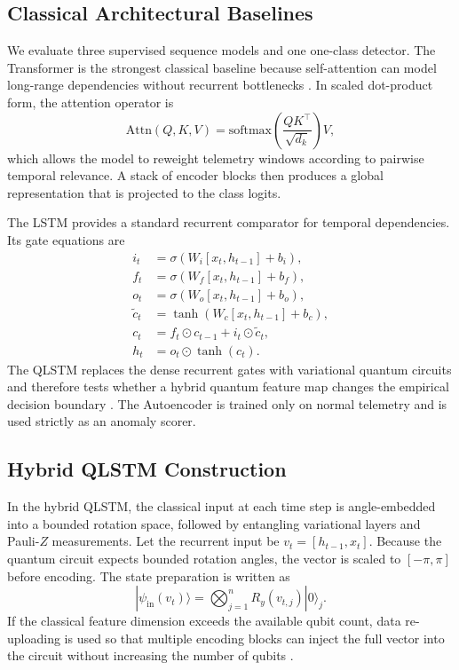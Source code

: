 \subsection{Classical Architectural Baselines}
We evaluate three supervised sequence models and one one-class detector. The Transformer is the strongest classical baseline because self-attention can model long-range dependencies without recurrent bottlenecks \cite{vaswani2017attention}. In scaled dot-product form, the attention operator is
\begin{equation}
\mathrm{Attn}(Q,K,V)=\mathrm{softmax}\!\left(\frac{QK^{\top}}{\sqrt{d_k}}\right)V,
\end{equation}
which allows the model to reweight telemetry windows according to pairwise temporal relevance. A stack of encoder blocks then produces a global representation that is projected to the class logits.

The LSTM provides a standard recurrent comparator for temporal dependencies. Its gate equations are
\begin{align}
i_t &= \sigma(W_i[x_t,h_{t-1}] + b_i), \\
f_t &= \sigma(W_f[x_t,h_{t-1}] + b_f), \\
o_t &= \sigma(W_o[x_t,h_{t-1}] + b_o), \\
\tilde{c}_t &= \tanh(W_c[x_t,h_{t-1}] + b_c), \\
c_t &= f_t \odot c_{t-1} + i_t \odot \tilde{c}_t, \\
h_t &= o_t \odot \tanh(c_t).
\end{align}
The QLSTM replaces the dense recurrent gates with variational quantum circuits and therefore tests whether a hybrid quantum feature map changes the empirical decision boundary \cite{qlstm, chen, bergholm2018pennylane}. The Autoencoder is trained only on normal telemetry and is used strictly as an anomaly scorer.

\subsection{Hybrid QLSTM Construction}
In the hybrid QLSTM, the classical input at each time step is angle-embedded into a bounded rotation space, followed by entangling variational layers and Pauli-$Z$ measurements. Let the recurrent input be $v_t=[h_{t-1},x_t]$. Because the quantum circuit expects bounded rotation angles, the vector is scaled to $[-\pi,\pi]$ before encoding. The state preparation is written as
\begin{equation}
|\psi_{\mathrm{in}}(v_t)\rangle=\bigotimes_{j=1}^{n}R_y(v_{t,j})|0\rangle_j.
\end{equation}
If the classical feature dimension exceeds the available qubit count, data re-uploading is used so that multiple encoding blocks can inject the full vector into the circuit without increasing the number of qubits \cite{data_reuploading}.

